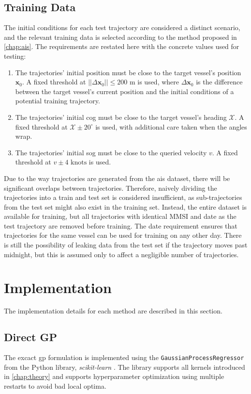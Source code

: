 \subsection{Training Data}
The initial conditions for each test trajectory are considered a distinct scenario, and the relevant training data is selected according to the method proposed in \cref{chap:ais}. The requirements are restated here with the concrete values used for testing:

\begin{enumerate}
    \item The trajectories' initial position must be close to the target vessel's position $\boldsymbol{x}_0$. A fixed threshold at $||\Delta \boldsymbol{x}_0|| \leq 200 \text{ m}$ is used, where $\Delta \boldsymbol{x}_0$ is the difference between the target vessel's current position and the initial conditions of a potential training trajectory.
    \item The trajectories' initial \acrshort{cog} must be close to the target vessel's heading $\mathcal{X}$. A fixed threshold at $\mathcal{X} \pm 20^\circ$ is used, with additional care taken when the angles wrap.
    \item The trajectories' initial \acrshort{sog} must be close to the queried velocity $v$. A fixed threshold at $v \pm 4 \text{ knots}$ is used.
\end{enumerate}

Due to the way trajectories are generated from the \acrshort{ais} dataset, there will be significant overlaps between trajectories. Therefore, naively dividing the trajectories into a train and test set is considered insufficient, as sub-trajectories from the test set might also exist in the training set. Instead, the entire dataset is available for training, but all trajectories with identical MMSI and date as the test trajectory are removed before training. The date requirement ensures that trajectories for the same vessel can be used for training on any other day. There is still the possibility of leaking data from the test set if the trajectory moves past midnight, but this is assumed only to affect a negligible number of trajectories.


\section{Implementation}
The implementation details for each method are described in this section.

\subsection{Direct GP}
The excact \acrshort{gp} formulation is implemented using the \texttt{GaussianProcessRegressor} from the Python library, \textit{scikit-learn} \cite{scikit-learn}. The library supports all kernels introduced in \cref{chap:theory} and supports hyperparameter optimization using multiple restarts to avoid bad local optima. 

